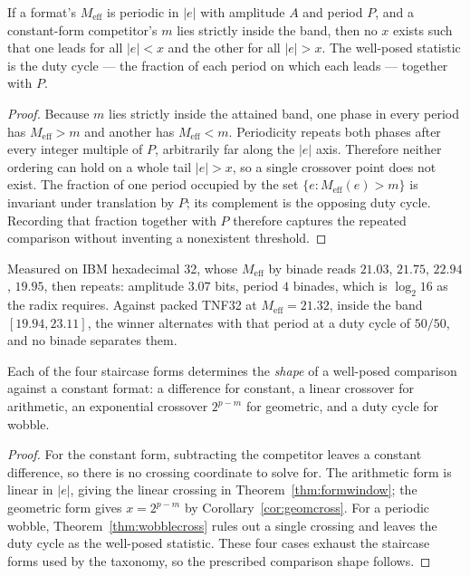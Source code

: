 \begin{theorem}
\label{thm:wobblecross}
If a format's $M_{\mathrm{eff}}$ is periodic in $|e|$ with amplitude $A$ and
period $P$, and a constant-form competitor's $m$ lies strictly inside the band,
then no $x$ exists such that one leads for all $|e| < x$ and the other for all
$|e| > x$. The well-posed statistic is the duty cycle --- the fraction of each
period on which each leads --- together with $P$.
\end{theorem}
\begin{proof}
Because $m$ lies strictly inside the attained band, one phase in every period
has $M_{\mathrm{eff}}>m$ and another has $M_{\mathrm{eff}}<m$. Periodicity
repeats both phases after every integer multiple of $P$, arbitrarily far along
the $|e|$ axis. Therefore neither ordering can hold on a whole tail
$|e|>x$, so a single crossover point does not exist. The fraction of one
period occupied by the set $\{e:M_{\mathrm{eff}}(e)>m\}$ is invariant under
translation by $P$; its complement is the opposing duty cycle. Recording that
fraction together with $P$ therefore captures the repeated comparison without
inventing a nonexistent threshold.
\end{proof}

Measured on IBM hexadecimal 32, whose $M_{\mathrm{eff}}$ by binade reads
$21.03$, $21.75$, $22.94$, $19.95$, then repeats: amplitude $3.07$ bits, period
$4$ binades, which is $\log_2 16$ as the radix requires. Against packed TNF32 at
$M_{\mathrm{eff}} = 21.32$, inside the band $[19.94, 23.11]$, the winner
alternates with that period at a duty cycle of $50/50$, and no binade separates
them.

\begin{corollary}
\label{cor:taxprescribes}
Each of the four staircase forms determines the \emph{shape} of a well-posed
comparison against a constant format: a difference for constant, a linear
crossover for arithmetic, an exponential crossover $2^{p-m}$ for geometric, and a
duty cycle for wobble.
\end{corollary}
\begin{proof}
For the constant form, subtracting the competitor leaves a constant difference,
so there is no crossing coordinate to solve for.  The arithmetic form is linear
in $|e|$, giving the linear crossing in Theorem~\ref{thm:formwindow}; the
geometric form gives $x=2^{p-m}$ by Corollary~\ref{cor:geomcross}.  For a
periodic wobble, Theorem~\ref{thm:wobblecross} rules out a single crossing and
leaves the duty cycle as the well-posed statistic.  These four cases exhaust the
staircase forms used by the taxonomy, so the prescribed comparison shape follows.
\end{proof}

